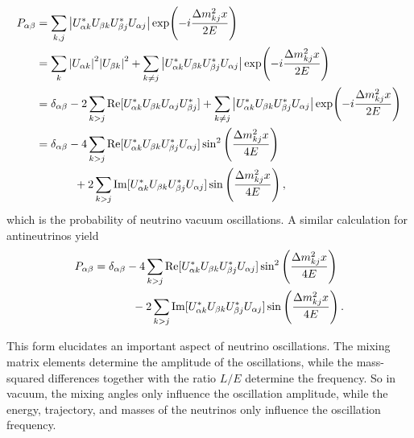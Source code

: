 \begin{align}\label{eq:Pab} 
    P_{\ab} &= \sum_{k,j} \abs{U_{\a k} ^ * U_{\b k}U_{\b j}^* U_{\a j}} \exp(-i\frac{\dm_{kj}x}{2E}) \nonumber \\
            &=  \sum_k \abs{U_{\a k}}^2\abs{U_{\b k}}^2 + \sum_{k \neq j} \abs{U_{\a k} ^ * U_{\b k}U_{\b j}^* U_{\a j}} \exp(-i\frac{\dm_{kj}x}{2E}) \nonumber \\
            &= \delta_{\a \b} - 2 \sum_{k>j}\Re[U_{\a k}^* U_{\b k} U_{\a j} U_{\b j}^*] +\sum_{k \neq j} \abs{U_{\a k} ^ * U_{\b k}U_{\b j}^* U_{\a j}} \exp(-i\frac{\dm_{kj}x}{2E}) \nonumber \\
            &= \delta_{\a \b} - 4\sum_{k > j} \Re[U_{\a k} ^ * U_{\b k}U_{\b j}^* U_{\a j}] \sin^2{\left(\frac{\dm_{kj}x}{4E}\right)} \nonumber \\
            &\hspace{1.2cm}+ 2\sum_{k > j} \Im[U_{\a k} ^ * U_{\b k}U_{\b j}^* U_{\a j}] \sin{\left(\frac{\dm_{kj}x}{4E}\right)}\,,
\end{align}
which is the probability of neutrino vacuum oscillations.
A similar calculation for antineutrinos yield  
\begin{align}
    P_{\ab} 
            &= \delta_{\a \b} - 4\sum_{k > j} \Re[U_{\a k} ^ * U_{\b k}U_{\b j}^* U_{\a j}] \sin^2{\left(\frac{\dm_{kj}x}{4E}\right)} \nonumber \\
            &\hspace{1.2cm}- 2\sum_{k > j} \Im[U_{\a k} ^ * U_{\b k}U_{\b j}^* U_{\a j}] \sin{\left(\frac{\dm_{kj}x}{4E}\right)}\,.
\end{align}

This form elucidates an important aspect of neutrino oscillations. The mixing matrix elements
determine the amplitude of the oscillations, while the mass-squared differences together with the ratio $L/E$ determine the
frequency. So in vacuum, the mixing angles only influence the oscillation amplitude, while the energy, trajectory, and masses of
the neutrinos only influence the oscillation frequency.

